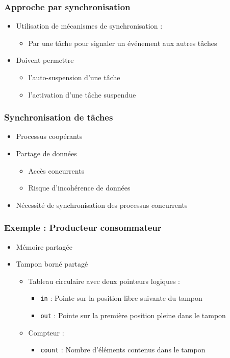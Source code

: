 \begin{frame}
\frametitle{Approche par synchronisation}
\begin{itemize}
\item Utilisation de mécanismes de synchronisation :
\begin{itemize}
\item Par une tâche pour signaler un événement aux autres tâches
\end{itemize}
\item Doivent permettre 
\begin{itemize}
\item l'auto-suspension d'une tâche 
\item l'activation d'une tâche suspendue
\end{itemize}
\end{itemize}
\end{frame}

\begin{frame}
\frametitle{Synchronisation de tâches}
\begin{itemize}
\item Processus coopérants
\item Partage de données
\begin{itemize}
\item Accès concurrents
\item Risque d’incohérence de données
\end{itemize}
\item Nécessité de synchronisation des processus concurrents
\end{itemize}
\end{frame}

\begin{frame}
\frametitle{Exemple : Producteur consommateur}
\begin{itemize}
\item Mémoire partagée
\item Tampon borné partagé
\begin{itemize}
\item Tableau circulaire avec deux pointeurs logiques :
\begin{itemize}
\item \texttt{in} : Pointe sur la position libre suivante du tampon
\item \texttt{out} : Pointe sur la première position pleine dans le tampon
\end{itemize}
\item Compteur :
\begin{itemize}
\item \texttt{count} : Nombre d’éléments contenus dans le tampon
\end{itemize}
\end{itemize}
\end{itemize}
\end{frame}

